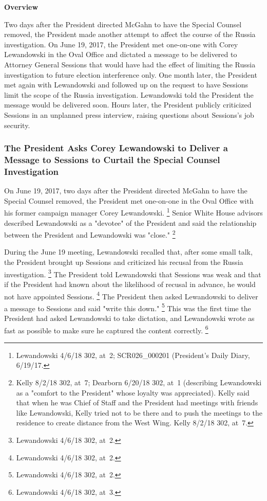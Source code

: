 {\begin{center}
\textbf{Overview}
\end{center}

Two days after the President directed McGahn to have the Special Counsel removed, the President made another attempt to affect the course of the Russia investigation.
On June 19, 2017, the President met one-on-one with Corey Lewandowski in the Oval Office and dictated a message to be delivered to Attorney General Sessions that would have had the effect of limiting the Russia investigation to future election interference only.
One month later, the President met again with Lewandowski and followed up on the request to have Sessions limit the scope of the Russia investigation.
Lewandowski told the President the message would be delivered soon.
Hours later, the President publicly criticized Sessions in an unplanned press interview, raising questions about Sessions's job security.

\subsubsection{The President Asks Corey Lewandowski to Deliver a Message to Sessions to Curtail the Special Counsel Investigation}

On June 19, 2017, two days after the President directed McGahn to have the Special Counsel removed, the President met one-on-one in the Oval Office with his former campaign manager Corey Lewandowski.%
\footnote{Lewandowski 4/6/18 302, at~2;
SCR026\_000201 (President's Daily Diary, 6/19/17.
}
Senior White House advisors described Lewandowski as a "devotee" of the President and said the relationship between the President and Lewandowski was "close."%
\footnote{Kelly 8/2/18 302, at~7;
Dearborn 6/20/18 302, at~1 (describing Lewandowski as a "comfort to the President" whose loyalty was appreciated).
Kelly said that when he was Chief of Staff and the President had meetings with friends like Lewandowski, Kelly tried not to be there and to push the meetings to the residence to create distance from the West Wing.
Kelly 8/2/18 302, at~7.}

During the June 19 meeting, Lewandowski recalled that, after some small talk, the President brought up Sessions and criticized his recusal from the Russia investigation.%
\footnote{Lewandowski 4/6/18 302, at~2.}
The President told Lewandowski that Sessions was weak and that if the President had known about the likelihood of recusal in advance, he would not have appointed Sessions.%
\footnote{Lewandowski 4/6/18 302, at~2.}
The President then asked Lewandowski to deliver a message to Sessions and said "write this down."%
\footnote{Lewandowski 4/6/18 302, at~2.}
This was the first time the President had asked Lewandowski to take dictation, and Lewandowski wrote as fast as possible to make sure he captured the content correctly.%
\footnote{Lewandowski 4/6/18 302, at~3.}

}
